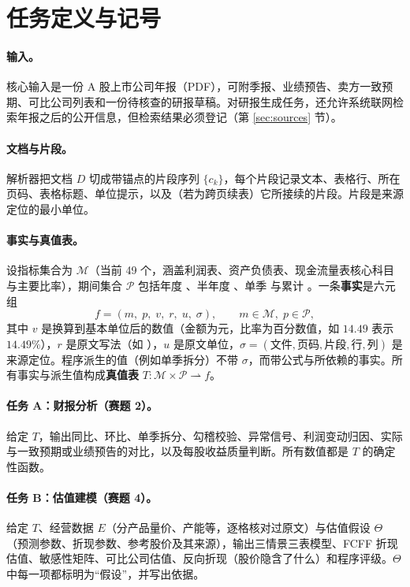 \section{任务定义与记号}
\label{sec:problem}

\paragraph{输入。}核心输入是一份 A 股上市公司年报（PDF），可附季报、业绩预告、卖方一致预期、可比公司列表和一份待核查的研报草稿。对研报生成任务，还允许系统联网检索年报之后的公开信息，但检索结果必须登记（第 \ref{sec:sources} 节）。

\paragraph{文档与片段。}解析器把文档 $D$ 切成带锚点的片段序列 $\{c_k\}$，每个片段记录文本、表格行、所在页码、表格标题、单位提示，以及（若为跨页续表）它所接续的片段。片段是来源定位的最小单位。

\paragraph{事实与真值表。}设指标集合为 $\mathcal{M}$（当前 49 个，涵盖利润表、资产负债表、现金流量表核心科目与主要比率），期间集合 $\mathcal{P}$ 包括年度 、半年度 、单季  与累计 。一条\textbf{事实}是六元组
\begin{equation}
  f = (m,\; p,\; v,\; r,\; u,\; \sigma),\qquad m\in\mathcal{M},\; p\in\mathcal{P},
\end{equation}
其中 $v$ 是换算到基本单位后的数值（金额为元，比率为百分数值，如 $14.49$ 表示 $14.49\%$），$r$ 是原文写法（如 ），$u$ 是原文单位，$\sigma=(\text{文件},\text{页码},\text{片段},\text{行},\text{列})$ 是来源定位。程序派生的值（例如单季拆分）不带 $\sigma$，而带公式与所依赖的事实。所有事实与派生值构成\textbf{真值表} $T:\mathcal{M}\times\mathcal{P}\rightharpoonup f$。

\paragraph{任务 A：财报分析（赛题 2）。}给定 $T$，输出同比、环比、单季拆分、勾稽校验、异常信号、利润变动归因、实际与一致预期或业绩预告的对比，以及每股收益质量判断。所有数值都是 $T$ 的确定性函数。

\paragraph{任务 B：估值建模（赛题 4）。}给定 $T$、经营数据 $E$（分产品量价、产能等，逐格核对过原文）与估值假设 $\Theta$（预测参数、折现参数、参考股价及其来源），输出三情景三表模型、FCFF 折现估值、敏感性矩阵、可比公司估值、反向折现（股价隐含了什么）和程序评级。$\Theta$ 中每一项都标明为“假设”，并写出依据。

